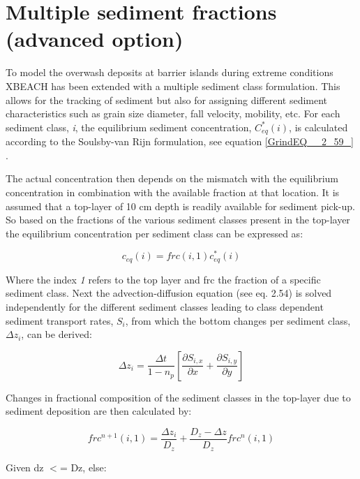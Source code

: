 \section{ Multiple sediment fractions (advanced option)}

To model the overwash deposits at barrier islands during extreme conditions XBEACH has been extended with a multiple sediment class formulation. This allows for the tracking of sediment but also for assigning different sediment characteristics such as grain size diameter, fall velocity, mobility, etc. For each sediment class, \textit{i}, the equilibrium sediment concentration, $C_{eq}^{*}(i)$, is calculated according to the Soulsby-van Rijn formulation, see equation \eqref{GrindEQ__2_59_} .

The actual concentration then depends on the mismatch with the equilibrium concentration in combination with the available fraction at that location. It is assumed that a top-layer of 10 cm depth is readily available for sediment pick-up. So based on the fractions of the various sediment classes present in the top-layer the equilibrium concentration per sediment class can be expressed as:

\begin{equation} \label{2.74)} 
c_{eq} (i)=frc(i,1)c_{eq}^{*} (i) 
\end{equation} 

Where the index \textit{1} refers to the top layer and frc the fraction of a specific sediment class.  Next the advection-diffusion equation (see eq. 2.54) is solved independently for the different sediment classes leading to class dependent sediment transport rates, $S_i$, from which the bottom changes per sediment class, $\Delta z_i$, can be derived:

\begin{equation} \label{2.75)} 
\Delta z_{i} =\frac{\Delta t}{1-n_{p} } \left[\frac{\partial S_{i,x} }{\partial x} +\frac{\partial S_{i,y} }{\partial y} \right] 
\end{equation} 

Changes in fractional composition of the sediment classes in the top-layer due to sediment deposition are then calculated by:

\begin{equation} \label{2.76)} 
frc^{n+1} (i,1)=\frac{\Delta z_{i} }{D_{z} } +\frac{D_{z} -\Delta z}{D_{z} } frc^{n} (i,1) 
\end{equation} 

Given dz $<$= Dz, else:

